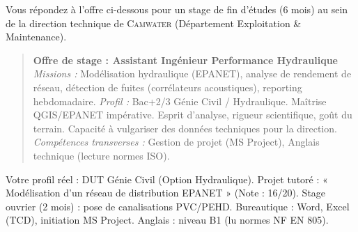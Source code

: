 \documentclass[11pt]{article}
\begin{document}
\begin{exercice}
Vous répondez à l'offre ci-dessous pour un stage de fin d'études (6 mois) au sein de la direction technique de \textsc{Camwater} (Département Exploitation \& Maintenance).

\begin{quote}
\textbf{Offre de stage : Assistant Ingénieur Performance Hydraulique}
\textit{Missions :} Modélisation hydraulique (EPANET), analyse de rendement de réseau, détection de fuites (corrélateurs acoustiques), reporting hebdomadaire.
\textit{Profil :} Bac+2/3 Génie Civil / Hydraulique. Maîtrise QGIS/EPANET impérative. Esprit d'analyse, rigueur scientifique, goût du terrain. Capacité à vulgariser des données techniques pour la direction.
\textit{Compétences transverses :} Gestion de projet (MS Project), Anglais technique (lecture normes ISO).
\end{quote}

Votre profil réel : DUT Génie Civil (Option Hydraulique). Projet tutoré : « Modélisation d'un réseau de distribution EPANET » (Note : 16/20). Stage ouvrier (2 mois) : pose de canalisations PVC/PEHD. Bureautique : Word, Excel (TCD), initiation MS Project. Anglais : niveau B1 (lu normes NF EN 805).


\end{exercice}
\end{document}
